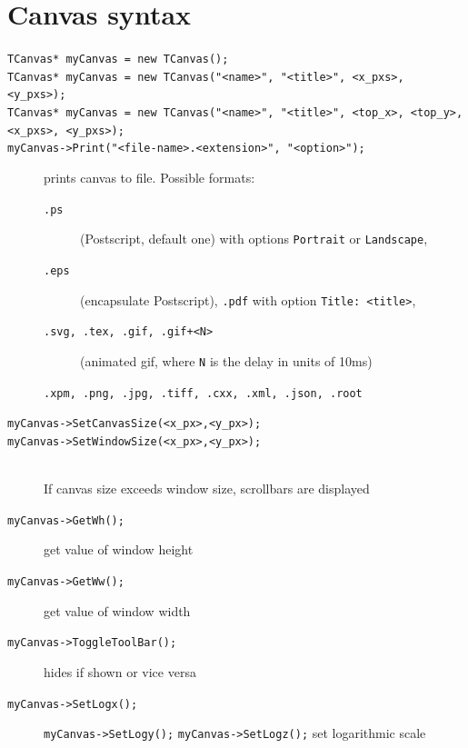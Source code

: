 \documentclass[10pt, twoside]{article}
\newcommand{\ttt}[1]{\colorbox{boxgray}{\texttt{#1}}}
\begin{document}
\section{Canvas syntax}
\begin{description}
\item[\ttt{TCanvas* myCanvas = new TCanvas();}]
\item[\ttt{TCanvas* myCanvas = new TCanvas("<name>", "<title>", <x\_pxs>, <y\_pxs>);}]
\item[\ttt{TCanvas* myCanvas = new TCanvas("<name>", "<title>", <top\_x>, <top\_y>, <x\_pxs>, <y\_pxs>);}]
\item[\ttt{myCanvas->Print("<file-name>.<extension>", "<option>");}] prints canvas to file. Possible formats: 
\begin{description}
\item[\ttt{.ps}] (Postscript, default one) with options \ttt{Portrait} or \ttt{Landscape}, \item[\ttt{.eps}] (encapsulate Postscript), \ttt{.pdf} with option \ttt{Title: <title>}, \item[\ttt{.svg, .tex, .gif, .gif+<N>}] (animated gif, where \ttt{N} is the delay in units of 10ms)
\item[\ttt{.xpm, .png, .jpg, .tiff, .cxx, .xml, .json, .root}]
\end{description}

\item[\ttt{myCanvas->SetCanvasSize(<x\_px>,<y\_px>);}]
\item[\ttt{myCanvas->SetWindowSize(<x\_px>,<y\_px>);}]{}\,\\
If canvas size exceeds window size, scrollbars are displayed
\item[\ttt{myCanvas->GetWh();}] get value of window height
\item[\ttt{myCanvas->GetWw();}] get value of window width
\item[\ttt{myCanvas->ToggleToolBar();}] hides if shown or vice versa
\item[\ttt{myCanvas->SetLogx();}] \ttt{myCanvas->SetLogy();} \ttt{myCanvas->SetLogz();} set logarithmic scale
\end{description}
\end{document}
